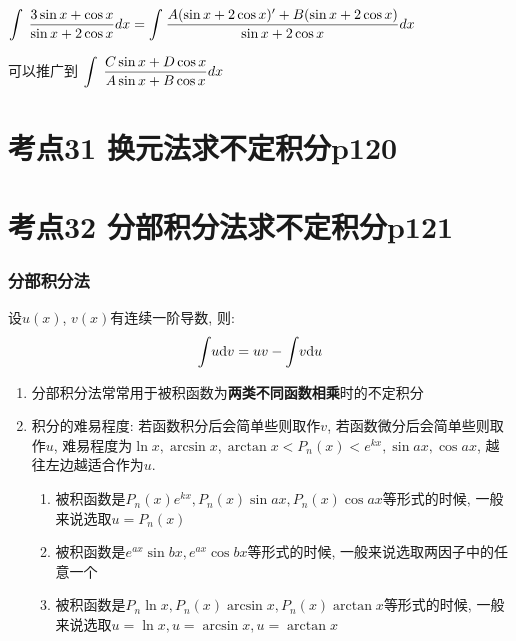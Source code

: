 \begin{tcolorbox}

\\

$\displaystyle\int_{}^{}\hspace{.2em}\frac{3\sin x+\cos x}{\sin x+2\cos x}dx=\int_{}^{}\frac{A(\sin x+2\cos x)'+B(\sin x+2\cos x)}{\sin x+2\cos x}dx$

可以推广到 $\displaystyle\int_{}^{}\hspace{.2em}\frac{C\sin x+D\cos x}{A\sin x+B\cos x}dx$

\end{tcolorbox}

\section{考点31 换元法求不定积分p120}

\section{考点32 分部积分法求不定积分p121}

\subsubsection{分部积分法}
设$ u(x) $, $ v(x) $有连续一阶导数, 则:
\begin{equation*}
\displaystyle\int_{}\hspace{.2em}u \mathrm{d}v=uv-\displaystyle\int_{}\hspace{.2em}v \mathrm{d}u
\end{equation*}
\begin{tcolorbox}
\begin{enumerate}
\item 分部积分法常常用于被积函数为\textbf{两类不同函数相乘}时的不定积分
\item 积分的难易程度: 若函数积分后会简单些则取作$ v $, 若函数微分后会简单些则取作$ u $, 难易程度为$ \ln x, \arcsin x, \arctan x<P_{n}(x)<e^{kx}, \sin ax, \cos ax $, 越往左边越适合作为$ u $.
\begin{enumerate}
\item 被积函数是$ P_{n}(x)e^{kx}, P_{n}(x)\sin ax, P_{n}(x)\cos ax $等形式的时候, 一般来说选取$ u=P_{n}(x) $
\item 被积函数是$ e^{ax}\sin bx, e^{ax}\cos bx $等形式的时候, 一般来说选取两因子中的任意一个
\item 被积函数是$ P_{n}\ln x, P_{n}(x)\arcsin x, P_{n}(x)\arctan x $等形式的时候, 一般来说选取$ u=\ln x, u=\arcsin x, u=\arctan x $
\end{enumerate}
\end{enumerate}
\end{tcolorbox}

